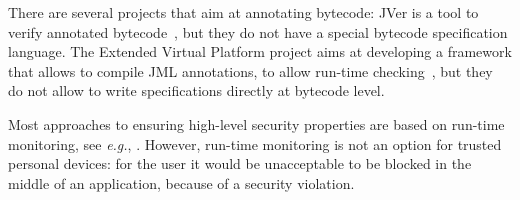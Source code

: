 There are several projects that aim at annotating bytecode: JVer is a
tool to verify annotated bytecode~\cite{ChanderEILN05b}, but they do
not have a special bytecode specification language.  The Extended
Virtual Platform project aims at developing a framework that allows to
compile JML annotations, to allow run-time
checking~\cite{AlagicR05}, but they do not allow to write
specifications directly at bytecode level.

Most approaches to ensuring high-level security properties are based
on run-time monitoring, see
\emph{e.g.}, \cite{bartetzko01assertions,Schneider99,Erlingsson03,ColcombetF00}. However,
run-time monitoring is not an option for trusted personal devices: for
the user it would be unacceptable to be blocked in the middle of an
application, because of a security violation.


